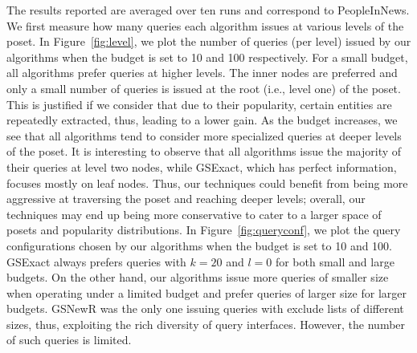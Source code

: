 The results reported are averaged over ten runs and correspond to PeopleInNews. We first measure how many queries each algorithm issues at various levels of the poset. In Figure~\ref{fig:level}, we plot the number of queries (per level) issued by our algorithms when the budget is set to 10 and 100 respectively. For a small budget, all algorithms prefer queries at higher levels. The inner nodes are preferred and only a small number of queries is issued at the root (i.e., level one) of the poset. This is justified if we consider that due to their popularity, certain entities are repeatedly extracted, thus, leading to a lower gain. As the budget increases, we see that all algorithms tend to consider more specialized queries at deeper levels of the poset. It is interesting to observe that all algorithms issue the majority of their queries at level two nodes, while GSExact, which has perfect information, focuses mostly on leaf nodes. Thus, our techniques could benefit from being more aggressive at traversing the poset and reaching deeper levels; overall, our techniques may end up being more conservative to cater to a larger space of posets and popularity distributions. In Figure~\ref{fig:queryconf}, we plot the query configurations chosen by our algorithms when the budget is set to 10 and 100. GSExact always prefers queries with $k = 20$ and $l = 0$ for both small and large budgets. On the other hand, our algorithms issue more queries of smaller size when operating under a limited budget and prefer queries of larger size for larger budgets. GSNewR was the only one issuing queries with exclude lists of different sizes, thus, exploiting the rich diversity of query interfaces. However, the number of such queries is limited. 


